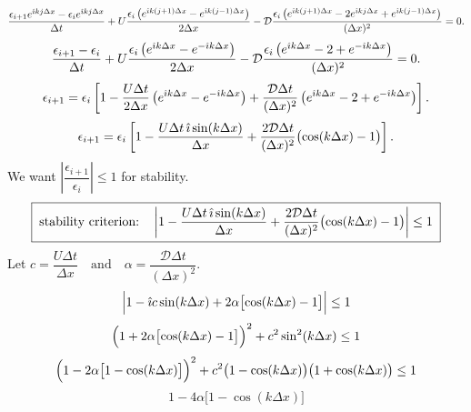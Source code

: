 \begin{solution}
    \[
        \frac{\epsilon_{i+1}e^{\hat{\imath} kj\Delta x} - \epsilon_i e^{\hat{\imath} kj\Delta x}}{\Delta t}
        + U\frac{\epsilon_i\left(e^{\hat{\imath} k(j+1)\Delta x} - e^{\hat{\imath} k(j-1)\Delta x}\right)}{2\Delta x}
        - \mathcal{D}\frac{\epsilon_i\left(e^{\hat{\imath} k(j+1)\Delta x} - 2e^{\hat{\imath} kj\Delta x} + e^{\hat{\imath} k(j-1)\Delta x}\right)}{(\Delta x)^2}
        = 0.
    \]
    \[
        \frac{\epsilon_{i+1} - \epsilon_i}{\Delta t}
        + U\frac{\epsilon_i\left(e^{\hat{\imath} k\Delta x} - e^{-\hat{\imath} k\Delta x}\right)}{2\Delta x}
        - \mathcal{D}\frac{\epsilon_i\left(e^{\hat{\imath} k\Delta x} - 2 + e^{-\hat{\imath} k\Delta x}\right)}{(\Delta x)^2}
        = 0.
    \]
    \[
        \epsilon_{i+1} = \epsilon_i\left[
            1 - \frac{U\Delta t}{2\Delta x}\left(e^{\hat{\imath} k\Delta x} - e^{-\hat{\imath} k\Delta x}\right)
            + \frac{\mathcal{D}\Delta t}{(\Delta x)^2}\left(e^{\hat{\imath} k\Delta x} - 2 + e^{-\hat{\imath} k\Delta x}\right)
        \right].
    \]
    \[
        \epsilon_{i+1} = \epsilon_i\left[
            1 - \frac{U\Delta t\,\hat{\imath}\sin(k\Delta x)}{\Delta x}
            + \frac{2\mathcal{D}\Delta t}{(\Delta x)^2}\bigl(\cos(k\Delta x) - 1\bigr)
        \right].
    \]
    We want $\left|\dfrac{\epsilon_{i+1}}{\epsilon_i}\right| \le 1$ for stability.
    \[
        \boxed{\;\text{stability criterion:}\quad
        \left|1 - \frac{U\Delta t\,\hat{\imath}\sin(k\Delta x)}{\Delta x}
        + \frac{2\mathcal{D}\Delta t}{(\Delta x)^2}\bigl(\cos(k\Delta x) - 1\bigr)\right| \le 1\;}
    \]
    Let \(c = \dfrac{U\Delta t}{\Delta x}
        \quad\text{and}\quad
        \alpha = \dfrac{\mathcal{D}\Delta t}{(\Delta x)^2}\).
    \[
        \Bigl|1 - \hat{\imath} c\sin(k\Delta x) + 2\alpha\bigl[\cos(k\Delta x) - 1\bigr]\Bigr| \le 1
    \]
    \[
        \Bigl(1 + 2\alpha\bigl[\cos(k\Delta x) - 1\bigr]\Bigr)^2
        + c^2\sin^2(k\Delta x) \le 1
    \]
    \[
        \Bigl(1 - 2\alpha\bigl[1 - \cos(k\Delta x)\bigr]\Bigr)^2
        + c^2\bigl(1-\cos(k\Delta x)\bigr)\bigl(1+\cos(k\Delta x)\bigr) \le 1
    \]
    \[
        1 - 4\alpha\bigl[1 - \cos(k\Delta x)\bigr]
\]
\end{solution}
